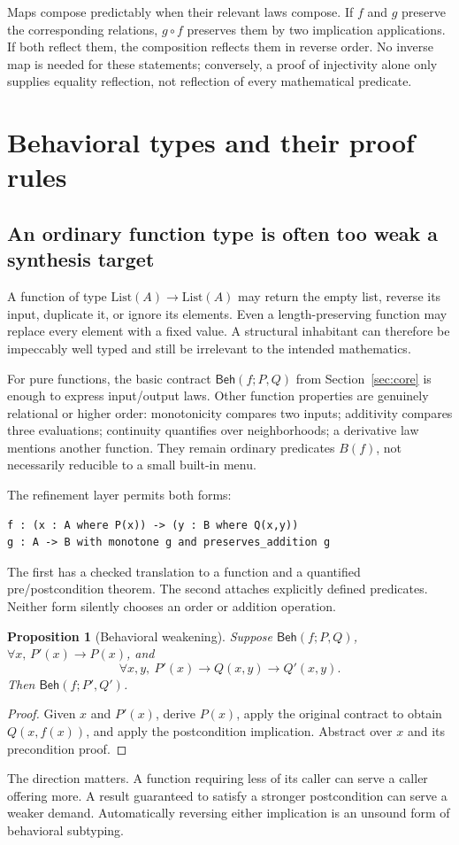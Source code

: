 \documentclass[11pt,a4paper]{article}
\newtheorem{proposition}[theorem]{Proposition}
\theoremstyle{definition}
\theoremstyle{remark}
\newcommand{\Beh}{\mathsf{Beh}}
\begin{document}
Maps compose predictably when their relevant laws compose. If $f$ and $g$ preserve the corresponding relations, $g\circ f$ preserves them by two implication applications. If both reflect them, the composition reflects them in reverse order. No inverse map is needed for these statements; conversely, a proof of injectivity alone only supplies equality reflection, not reflection of every mathematical predicate.

\section{Behavioral types and their proof rules}
\label{sec:behavior}

\subsection{An ordinary function type is often too weak a synthesis target}
A function of type $\mathrm{List}(A)\to\mathrm{List}(A)$ may return the empty list, reverse its input, duplicate it, or ignore its elements. Even a length-preserving function may replace every element with a fixed value. A structural inhabitant can therefore be impeccably well typed and still be irrelevant to the intended mathematics.

For pure functions, the basic contract $\Beh(f;P,Q)$ from Section~\ref{sec:core} is enough to express input/output laws. Other function properties are genuinely relational or higher order: monotonicity compares two inputs; additivity compares three evaluations; continuity quantifies over neighborhoods; a derivative law mentions another function. They remain ordinary predicates $B(f)$, not necessarily reducible to a small built-in menu.

The refinement layer permits both forms:
\begin{lstlisting}
f : (x : A where P(x)) -> (y : B where Q(x,y))
g : A -> B with monotone g and preserves_addition g
\end{lstlisting}
The first has a checked translation to a function and a quantified pre/postcondition theorem. The second attaches explicitly defined predicates. Neither form silently chooses an order or addition operation.

\begin{proposition}[Behavioral weakening]
\label{prop:weakening}
Suppose $\Beh(f;P,Q)$, $\forall x,\,P'(x)\to P(x)$, and
\[
 \forall x,y,\ P'(x)\to Q(x,y)\to Q'(x,y).
\]
Then $\Beh(f;P',Q')$.
\end{proposition}
\begin{proof}
Given $x$ and $P'(x)$, derive $P(x)$, apply the original contract to obtain $Q(x,f(x))$, and apply the postcondition implication. Abstract over $x$ and its precondition proof.
\end{proof}
The direction matters. A function requiring less of its caller can serve a caller offering more. A result guaranteed to satisfy a stronger postcondition can serve a weaker demand. Automatically reversing either implication is an unsound form of behavioral subtyping.
\end{document}
